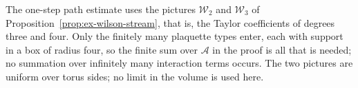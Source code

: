 \begin{remark}
\label{rem:ex-wilson-stream-use}
The one-step path estimate uses the pictures $\mathcal W_2$ and
$\mathcal W_3$ of Proposition~\ref{prop:ex-wilson-stream}, that is, the
Taylor coefficients of degrees three and four. Only the finitely many
plaquette types enter, each with support in a box of radius four, so the
finite sum over $\mathcal A$ in the proof is all that is needed; no
summation over infinitely many interaction terms occurs. The two pictures
are uniform over torus sides; no limit in the volume is used here.
\end{remark}

